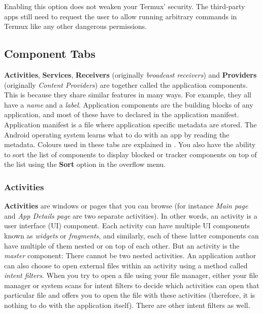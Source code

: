 \begin{tip}[Info]
    Enabling this option does not weaken your Termux' security. The third-party apps still need to request the user to
    allow running arbitrary commands in Termux like any other dangerous permissions.
\end{tip}

\subsection{Component Tabs}\label{subsec:component-tabs}
\textbf{Activities}, \textbf{Services}, \textbf{Receivers} (originally \textit{broadcast receivers}) and
\textbf{Providers} (originally \textit{Content Providers}) are together called the application components. This is
because they share similar features in many ways. For example, they all have a \textit{name} and a \textit{label}.
Application components are the building blocks of any application, and most of these have to declared in the application
manifest. Application manifest is a file where application specific metadata are stored. The Android operating system
learns what to do with an app by reading the metadata. Colours used in these tabs are explained in
. You also have the ability to sort the list of components to display blocked or
tracker components on top of the list using the \textbf{Sort} option in the overflow menu.

\subsubsection{Activities}\label{subsubsec:activities}
\textbf{Activities} are windows or pages that you can browse (for instance \textit{Main page} and \textit{App Details
page} are two separate activities). In other words, an activity is a user interface (UI) component. Each activity can
have multiple UI components known as \textit{widgets} or \textit{fragments}, and similarly, each of these latter
components can have multiple of them nested or on top of each other. But an activity is the \textit{master} component:
There cannot be two nested activities. An application author can also choose to open external files within an activity
using a method called \textit{intent filters}. When you try to open a file using your file manager, either your file
manager or system scans for intent filters to decide which activities can open that particular file and offers you to
open the file with these activities (therefore, it is nothing to do with the application itself). There are other intent
filters as well.

